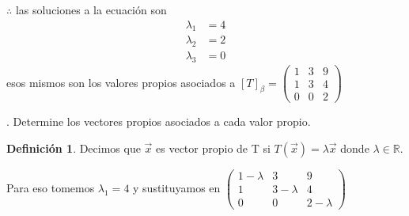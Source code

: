 \documentclass[letterpaper]{article}
\renewcommand{\*}{\cdot}
\newcommand{\T}{\begin{pmatrix}
		1 & 3 & 9 \\
		1 & 3 & 4 \\
		0 & 0 & 2 
\end{pmatrix} }
\theoremstyle{definition}
\newtheorem{definition}{Definición}
\begin{document}
\begin{center}
	$ \therefore  $ las soluciones a la ecuación son 
	\begin{align*}
		\lambda_1 &= 4\\
		\lambda_2 &= 2\\
		\lambda_3 &= 0
	\end{align*} esos mismos son los valores propios asociados a $ [T]_\beta = \T $
\end{center}
. Determine los vectores propios asociados a cada valor propio. 
\begin{definition}
	Decimos que $\vec{x}$ es vector propio de T si $T(\vec{x})= \lambda\vec{x}$ donde $\lambda\in \mathbb{R}$.
\end{definition}

Para eso tomemos $ \lambda_1 = 4 $ y sustituyamos en $ \begin{pmatrix}
1- \lambda & 3 & 9\\
1 & 3 -\lambda & 4\\
0 & 0 & 2- \lambda 
\end{pmatrix} $
\end{document}
